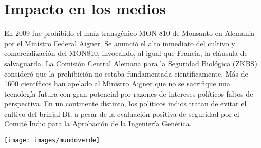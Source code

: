 \documentclass[11pt,a4paper]{article}
\begin{document}
\section{Impacto en los medios}


En 2009 fue prohibido el maíz transgénico MON 810 de Monsanto en Alemania por el Ministro Federal Aigner. Se anunció el alto inmediato del cultivo y comercialización del MON810, invocando, al igual que Francia, la cláusula de salvaguarda.
La Comisión Central Alemana para la Seguridad Biológica (ZKBS) consideró que la prohibición no estaba fundamentada científicamente. Más de 1600 científicos han apelado al Ministro Aigner que no se sacrifique una tecnología futura con gran potencial por razones de intereses políticos faltos de perspectiva. En un continente distinto, los políticos indios tratan de evitar el cultivo del brinjal Bt, a pesar de la evaluación positiva de seguridad por el Comité Indio para la Aprobación de la Ingeniería Genética.  



%
%               
%


\vskip2cm
\begin{center}
\href{http://www.sciencemag.org/}{\texttt{[image: images/mundoverde]}}
\end{center}



\newpage
\listoftables


\listoffigures




\end{document}
